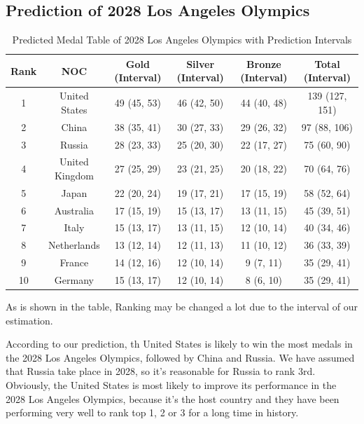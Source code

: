 \subsection{Prediction of 2028 Los Angeles Olympics}
\begin{table}[htbp]
    \centering
    \caption{Predicted Medal Table of 2028 Los Angeles Olympics with Prediction Intervals}
    \begin{tabular}{|c|c|c|c|c|c|}
        \hline
        Rank & NOC & Gold (Interval) & Silver (Interval) & Bronze (Interval) & Total (Interval) \\
        \hline
        1 & United States & 49 (45, 53) & 46 (42, 50) & 44 (40, 48) & 139 (127, 151) \\
        2 & China & 38 (35, 41) & 30 (27, 33) & 29 (26, 32) & 97 (88, 106) \\
        3 & Russia & 28 (23, 33) & 25 (20, 30) & 22 (17, 27) & 75 (60, 90) \\
        4 & United Kingdom & 27 (25, 29) & 23 (21, 25) & 20 (18, 22) & 70 (64, 76) \\
        5 & Japan & 22 (20, 24) & 19 (17, 21) & 17 (15, 19) & 58 (52, 64) \\
        6 & Australia & 17 (15, 19) & 15 (13, 17) & 13 (11, 15) & 45 (39, 51) \\
        7 & Italy & 15 (13, 17) & 13 (11, 15) & 12 (10, 14) & 40 (34, 46) \\
        8 & Netherlands & 13 (12, 14) & 12 (11, 13) & 11 (10, 12) & 36 (33, 39) \\
        9 & France & 14 (12, 16) & 12 (10, 14) & 9 (7, 11) & 35 (29, 41) \\
        10 & Germany & 15 (13, 17) & 12 (10, 14) & 8 (6, 10) & 35 (29, 41) \\
        \hline
    \end{tabular}
    \label{tab:2028}
\end{table}

As is shown in the table, Ranking may be changed a lot due to the interval of our estimation.

According to our prediction, th United States is likely to win the most medals in the 2028 Los Angeles Olympics, followed by China and Russia. We have assumed that Russia take place in 2028, so it's reasonable for Russia to rank 3rd. Obviously, the United States is most likely to improve its performance in the 2028 Los Angeles Olympics, because it's the host country and they have been performing very well to rank top 1, 2 or 3 for a long time in history.

